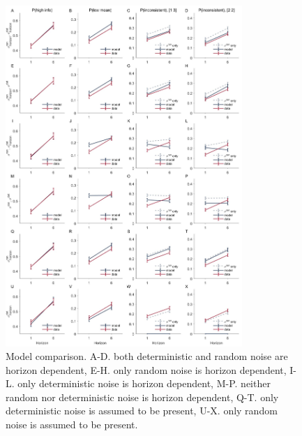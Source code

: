 \documentclass[12pt]{article}
\begin{document}
	\begin{figure}[hp]
		\begin{center}
			\includegraphics[width=0.8\textwidth]{figures/R1_2noise_6modelcomparison_dist.jpg}
			\caption{
				Model comparison. A-D. both deterministic and random noise are horizon dependent, E-H. only random noise is horizon dependent, I-L. only deterministic noise is horizon dependent, M-P. neither random nor deterministic noise is horizon dependent, Q-T. only deterministic noise is assumed to be present, U-X. only random noise is assumed to be present.}
			\label{fig:posteriorcheck6models}
		\end{center}
	\end{figure}
\end{document}

